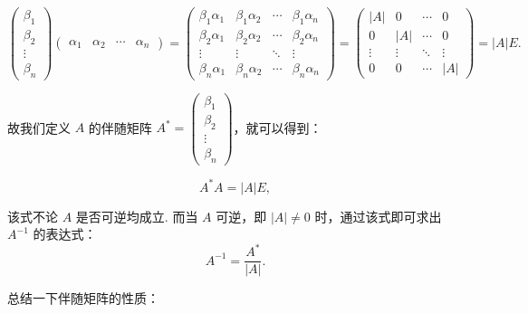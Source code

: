 \[
    \begin{pmatrix}
        \beta_1 \\ \beta_2 \\ \vdots \\ \beta_n
    \end{pmatrix} \begin{pmatrix}
        \alpha_1 & \alpha_2 & \cdots & \alpha_n
    \end{pmatrix} = \begin{pmatrix}
        \beta_1 \alpha_1 & \beta_1 \alpha_2 & \cdots & \beta_1 \alpha_n \\
        \beta_2 \alpha_1 & \beta_2 \alpha_2 & \cdots & \beta_2 \alpha_n \\
        \vdots & \vdots & \ddots & \vdots \\
        \beta_n \alpha_1 & \beta_n \alpha_2 & \cdots & \beta_n \alpha_n
    \end{pmatrix} = \begin{pmatrix}
        |A| & 0 & \cdots & 0 \\
        0 & |A| & \cdots & 0 \\
        \vdots & \vdots & \ddots & \vdots \\
        0 & 0 & \cdots & |A|
    \end{pmatrix} = |A| E.
\]

故我们定义 $A$ 的伴随矩阵 $A^* = \begin{pmatrix}
    \beta_1 \\ \beta_2 \\ \vdots \\ \beta_n
\end{pmatrix}$，就可以得到：

\[
    A^* A = |A| E,
\]

该式不论 $A$ 是否可逆均成立. 而当 $A$ 可逆，即 $|A| \neq 0$ 时，通过该式即可求出 $A^{-1}$ 的表达式：
\[
    A^{-1} = \frac{A^*}{|A|}.
\]

总结一下伴随矩阵的性质：

